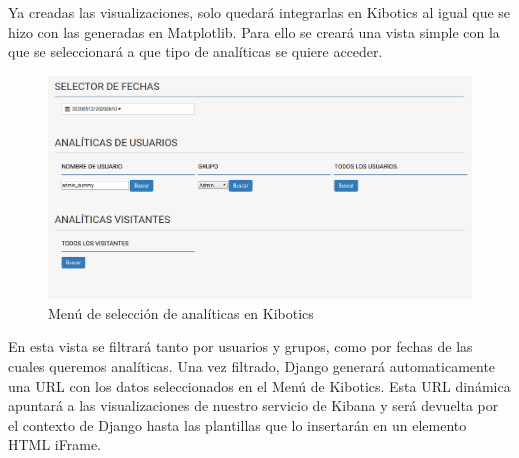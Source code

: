 \documentclass[11pt,a4paper]{book}
\begin{document}
				Ya creadas las visualizaciones, solo quedará integrarlas en Kibotics al igual que se hizo con las generadas en Matplotlib. Para ello se creará una vista simple con la que se seleccionará a que tipo de analíticas se quiere acceder.

				\begin{figure}[H]
					\centering
					\includegraphics[width=12cm, keepaspectratio]{img/kibotics_analytics_menu.png}
					\caption{Menú de selección de analíticas en Kibotics}
					\label{fig:kibotics_analytics_menu}
				\end{figure}
			
				En esta vista se filtrará tanto por usuarios y grupos, como por fechas de las cuales queremos analíticas. Una vez filtrado, Django generará automaticamente una URL con los datos seleccionados en el Menú de Kibotics. Esta URL dinámica apuntará a las visualizaciones de nuestro servicio de Kibana y será devuelta por el contexto de Django hasta las plantillas que lo insertarán en un elemento HTML iFrame.
				
\end{document}
